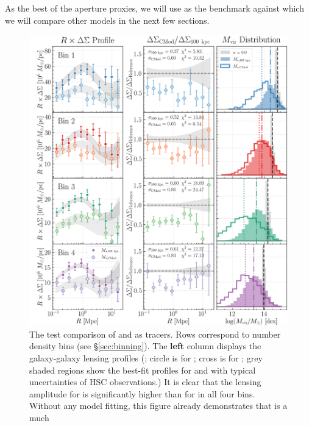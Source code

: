\documentclass[fleqn,usenatbib,useAMS,english]{mnras}
\begin{document}
    As the best of the aperture \mstar{} proxies, we will use  as the benchmark
    against which we will compare other models in the next few sections.
  \begin{figure}
      \centering
      \includegraphics[width=\textwidth]{figure/topn_fig_7}
      \caption{
          The \topn{} test comparison of  and \mcmodel{} as \mhalo{} tracers.
          Rows correspond to number density bins (see \S \ref{sec:binning}).
          The \textbf{left} column displays the galaxy-galaxy lensing profiles (\rdsigma{}; circle is
          for ; cross is for \mcmodel{}; grey shaded regions show the best-fit
          profiles for \maper{} and \mcmodel{} with typical uncertainties of HSC observations.)
          It is clear that the lensing amplitude for  is significantly higher than for
          \mcmodel{} in all four bins.
          Without any model fitting, this figure already demonstrates that  is a much
}
\end{figure}
\end{document}
